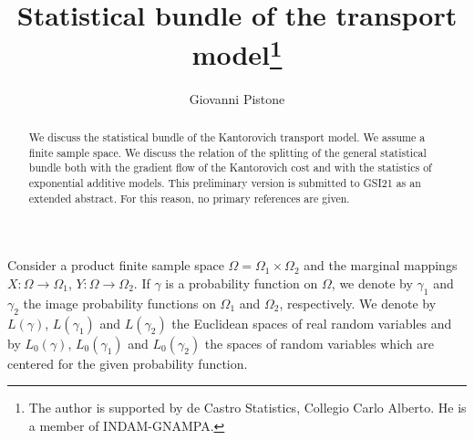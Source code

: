 \documentclass[runningheads]{llncs}
\begin{document}
%
\title{Statistical bundle of the transport model\thanks{The author is
    supported by de Castro Statistics, Collegio Carlo Alberto. He is a member of INDAM-GNAMPA.}}
%
%
\author{Giovanni Pistone}
%
%
%
\maketitle              %
%
\begin{abstract}
  We discuss the statistical bundle of the Kantorovich transport
  model. We assume a finite sample space. We discuss the relation of
  the splitting of the general statistical bundle both with the
  gradient flow of the Kantorovich cost and with the statistics of
  exponential additive models. This preliminary version is submitted
  to GSI21 as an extended abstract. For this reason, no primary references are
  given.  
\end{abstract}

Consider a product finite sample space
$\Omega=\Omega_1 \times \Omega_2$ and the marginal mappings
$X \colon \Omega \to \Omega_1$, $Y \colon \Omega \to \Omega_2$. If
$\gamma$ is a probability function on $\Omega$, we denote by
$\gamma_1$ and $\gamma_2$ the image probability functions on
$\Omega_1$ and $\Omega_2$, respectively. We denote by $L(\gamma)$,
$L(\gamma_1)$ and $L(\gamma_2)$ the Euclidean spaces of real random
variables and by $L_0(\gamma)$, $L_0(\gamma_1)$ and $L_0(\gamma_2)$
the spaces of random variables which are centered for the given
probability function.
\end{document}

